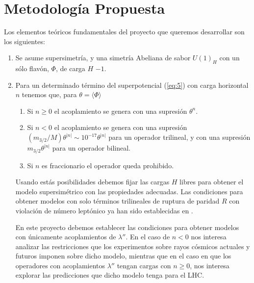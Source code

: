 \section{ Metodología Propuesta }

Los elementos teóricos fundamentales del proyecto que queremos desarrollar
son los siguientes:

\begin{enumerate}
\item Se asume supersimetría,   y una simetría Abeliana de sabor $U(1)_H$ con un sólo flavón, $\Phi$, de carga $H$ $-1$.

\item Para un determinado término del superpotencial (\ref{eq:5}) con carga horizontal $n$ tenemos que, para $\theta=\langle\Phi\rangle$
  \begin{enumerate}
  \item Si $n\ge 0$ el acoplamiento se genera con una supresión $\theta^n$.
  \item Si $n<0$ el acoplamiento se genera con una supresión $(m_{3/2}/M)\theta^{|n|}\sim 10^{-17}\theta^{|n|}$ para un operador trilineal, y con una supresión $m_{3/2}\theta^{|n|}$ para un operador bilineal.
  \item Si $n$ es fraccionario el operador queda prohibido.
  \end{enumerate}
Usando estás posibilidades debemos fijar las cargas $H$ libres para obtener el modelo supersimétrico con las propiedades adecuadas. Las condiciones para obtener modelos con solo términos trilineales de ruptura de paridad $R$ con violación de número leptónico ya han sido establecidas en \cite{Sierra:2009zq}.

En este proyecto debemos establecer las condiciones para obtener modelos con únicamente acoplamientos de $\lambda''$. En el caso de $n<0$ nos interesa analizar las restricciones que los experimentos sobre rayos cósmicos actuales y futuros imponen sobre dicho modelo, mientras que en el caso en que los operadores con acoplamientos $\lambda''$ tengan cargas con $n\ge 0$, nos interesa explorar las predicciones que dicho modelo tenga para el LHC.
\end{enumerate}

